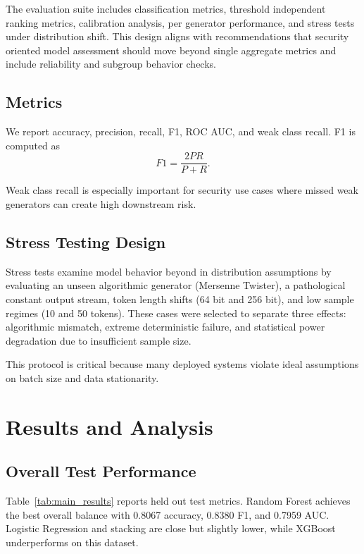 \documentclass[conference]{IEEEtran}
\begin{document}
The evaluation suite includes classification metrics, threshold independent ranking metrics, calibration analysis, per generator performance, and stress tests under distribution shift. This design aligns with recommendations that security oriented model assessment should move beyond single aggregate metrics and include reliability and subgroup behavior checks.

\subsection{Metrics}
We report accuracy, precision, recall, F1, ROC AUC, and weak class recall. F1 is computed as
\begin{equation}
F1 = \frac{2PR}{P+R}.
\end{equation}

Weak class recall is especially important for security use cases where missed weak generators can create high downstream risk.

\subsection{Stress Testing Design}
Stress tests examine model behavior beyond in distribution assumptions by evaluating an unseen algorithmic generator (Mersenne Twister), a pathological constant output stream, token length shifts (64 bit and 256 bit), and low sample regimes (10 and 50 tokens). These cases were selected to separate three effects: algorithmic mismatch, extreme deterministic failure, and statistical power degradation due to insufficient sample size.

This protocol is critical because many deployed systems violate ideal assumptions on batch size and data stationarity.

\section{Results and Analysis}
\subsection{Overall Test Performance}
Table~\ref{tab:main_results} reports held out test metrics. Random Forest achieves the best overall balance with 0.8067 accuracy, 0.8380 F1, and 0.7959 AUC. Logistic Regression and stacking are close but slightly lower, while XGBoost underperforms on this dataset.
\end{document}
